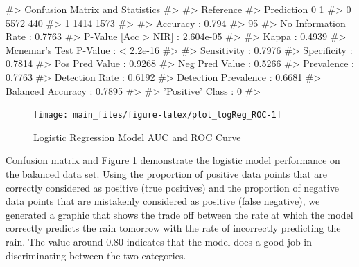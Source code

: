 \begin{Schunk}
\begin{Soutput}
#> Confusion Matrix and Statistics
#> 
#>           Reference
#> Prediction    0    1
#>          0 5572  440
#>          1 1414 1573
#>                                           
#>                Accuracy : 0.794           
#>                  95%
#>     No Information Rate : 0.7763          
#>     P-Value [Acc > NIR] : 2.604e-05       
#>                                           
#>                   Kappa : 0.4939          
#>  Mcnemar's Test P-Value : < 2.2e-16       
#>                                           
#>             Sensitivity : 0.7976          
#>             Specificity : 0.7814          
#>          Pos Pred Value : 0.9268          
#>          Neg Pred Value : 0.5266          
#>              Prevalence : 0.7763          
#>          Detection Rate : 0.6192          
#>    Detection Prevalence : 0.6681          
#>       Balanced Accuracy : 0.7895          
#>                                           
#>        'Positive' Class : 0               
#> 
\end{Soutput}
\end{Schunk}

\begin{Schunk}
\begin{figure}[H]

{\centering \texttt{[image: main\_files/figure-latex/plot\_logReg\_ROC-1]} 

}

\caption[Logistic Regression Model AUC and ROC Curve]{Logistic Regression Model AUC and ROC Curve}\label{fig:plot_logReg_ROC}
\end{figure}
\end{Schunk}

Confusion matrix and Figure \ref{fig:plot_logReg_ROC} demonstrate the
logistic model performance on the balanced data set. Using the
proportion of positive data points that are correctly considered as
positive (true positives) and the proportion of negative data points
that are mistakenly considered as positive (false negative), we
generated a graphic that shows the trade off between the rate at which
the model correctly predicts the rain tomorrow with the rate of
incorrectly predicting the rain. The value around 0.80 indicates that
the model does a good job in discriminating between the two categories.

